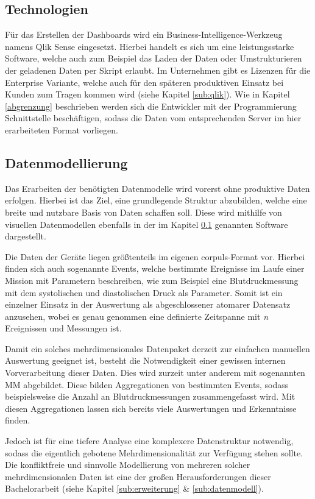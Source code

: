 \subsection{Technologien}\label{tech}
Für das Erstellen der Dashboards wird ein Business-Intelligence-Werkzeug namens \glqq Qlik Sense\grqq{} eingesetzt.
Hierbei handelt es sich um eine leistungsstarke Software, welche auch zum Beispiel das Laden der Daten oder Umstrukturieren der geladenen Daten per Skript erlaubt.
Im Unternehmen gibt es Lizenzen für die Enterprise Variante, welche auch für den späteren produktiven Einsatz bei Kunden zum Tragen kommen wird (siehe Kapitel \ref{sub:qlik}).
Wie in Kapitel \ref{abgrenzung} beschrieben werden sich die Entwickler mit der Programmierung Schnittstelle beschäftigen, sodass die Daten vom entsprechenden Server im hier erarbeiteten Format vorliegen.

\subsection{Datenmodellierung}
Das Erarbeiten der benötigten Datenmodelle wird vorerst ohne produktive Daten erfolgen.
Hierbei ist das Ziel, eine grundlegende Struktur abzubilden, welche eine breite und nutzbare Basis von Daten schaffen soll.
Diese wird mithilfe von visuellen Datenmodellen ebenfalls in der im Kapitel \ref{tech} genannten
Software dargestellt.

Die Daten der Geräte liegen größtenteils im eigenen \glqq corpuls\grqq{}-Format vor. 
Hierbei finden sich auch sogenannte \glqq Events\grqq{}, welche bestimmte Ereignisse im Laufe einer Mission mit Parametern beschreiben, wie zum Beispiel eine Blutdruckmessung mit dem systolischen und diastolischen Druck als Parameter.
Somit ist ein einzelner Einsatz in der Auswertung als abgeschlossener atomarer Datensatz anzusehen, wobei es genau genommen eine definierte Zeitspanne mit \textit{n} Ereignissen und Messungen ist. 

Damit ein solches mehrdimensionales Datenpaket derzeit zur einfachen manuellen Auswertung geeignet ist, besteht die Notwendigkeit einer gewissen internen Vorverarbeitung dieser Daten.
Dies wird zurzeit unter anderem mit sogenannten \glqq \gls{MM} \grqq{} abgebildet.
Diese bilden Aggregationen von bestimmten Events, sodass beispielsweise die Anzahl an Blutdruckmessungen zusammengefasst wird. 
Mit diesen Aggregationen lassen sich bereits viele Auswertungen und Erkenntnisse finden.

Jedoch ist für eine tiefere Analyse eine komplexere Datenstruktur notwendig, sodass die eigentlich gebotene Mehrdimensionalität zur Verfügung stehen sollte. 
Die konfliktfreie und sinnvolle Modellierung von mehreren solcher mehrdimensionalen Daten ist eine der großen Herausforderungen dieser Bachelorarbeit (siehe Kapitel \ref{sub:erweiterung} \& \ref{sub:datenmodell}).
